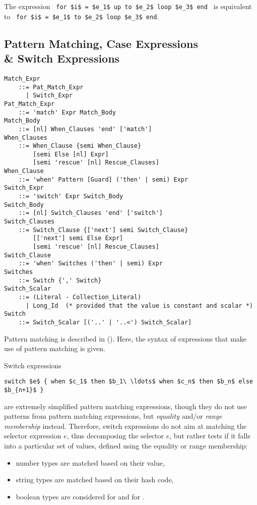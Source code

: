 The expression ~\lstinline!for $i$ = $e_1$ up to $e_2$ loop $e_3$ end!~ is equivalent to ~\lstinline!for $i$ = $e_1$ to $e_2$ loop $e_3$ end!. 





\subsection[Pattern Matching, Case Expressions \& Switch Expressions]{Pattern Matching, Case Expressions \\\& Switch Expressions}
\label{sec:case-exprs}


\grammar\begin{lstlisting}
Match_Expr     
    ::= Pat_Match_Expr 
      | Switch_Expr
Pat_Match_Expr 
    ::= 'match' Expr Match_Body
Match_Body 
    ::= [nl] When_Clauses 'end' ['match']
When_Clauses
    ::= When_Clause {semi When_Clause} 
        [semi Else [nl] Expr]
        [semi 'rescue' [nl] Rescue_Clauses]
When_Clause 
    ::= 'when' Pattern [Guard] ('then' | semi) Expr
Switch_Expr 
    ::= 'switch' Expr Switch_Body
Switch_Body 
    ::= [nl] Switch_Clauses 'end' ['switch']
Switch_Clauses 
    ::= Switch_Clause {['next'] semi Switch_Clause}
        [['next'] semi Else Expr]
        [semi 'rescue' [nl] Rescue_Clauses]
Switch_Clause 
    ::= 'when' Switches ('then' | semi) Expr
Switches 
    ::= Switch {',' Switch}
Switch_Scalar 
    ::= (Literal - Collection_Literal)
      | Long_Id  (* provided that the value is constant and scalar *)
Switch 
    ::= Switch_Scalar [('..' | '..<') Switch_Scalar]
\end{lstlisting}

Pattern matching is described in (). Here, the syntax of expressions that make use of pattern matching is given. 

Switch expressions 
\begin{lstlisting}
switch $e$ { when $c_1$ then $b_1\ \ldots$ when $c_n$ then $b_n$ else $b_{n+1}$ }
\end{lstlisting}
are extremely simplified pattern matching expressions, though they do not use patterns from pattern matching expressions, but {\em equality} and/or {\em range membership} instead. Therefore, switch expressions do not aim at matching the selector expression $e$, thus decomposing the selector $e$, but rather tests if it falls into a particular set of values, defined using the equality or range membership:
\begin{itemize}
  \item number types are matched based on their value,
  \item string types are matched based on their hash code,
  \item boolean types are considered  for  and  for .
\end{itemize}

